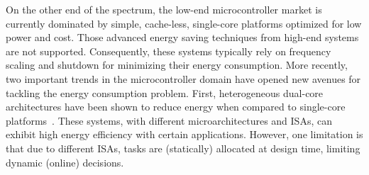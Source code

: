 
On the other end of the spectrum, the low-end microcontroller market is currently dominated by simple, cache-less, single-core platforms optimized for low power and cost. Those advanced energy saving techniques from high-end systems are not supported. Consequently, these systems typically rely on frequency scaling and shutdown for minimizing their energy consumption. More recently, two important trends in the microcontroller domain have opened new avenues for tackling the energy consumption problem. First, heterogeneous dual-core architectures have been shown to reduce energy when compared to single-core platforms~\cite{Fuks}. These systems, with different microarchitectures and ISAs, can exhibit high energy efficiency with certain applications. However, one limitation is that due to different ISAs, tasks are (statically) allocated at design time, limiting dynamic (online) decisions.%

